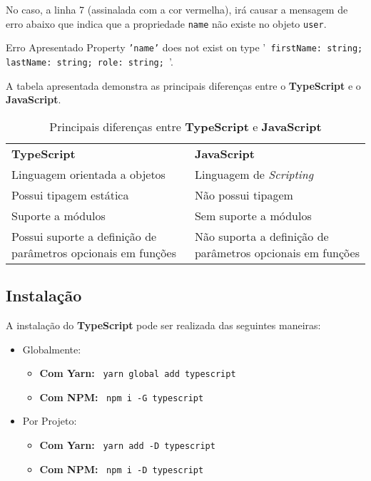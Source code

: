 No caso, a linha 7 (assinalada com a cor vermelha), irá causar a mensagem de erro abaixo que indica que a propriedade \texttt{name} não existe no objeto \texttt{user}.

\begin{errorbox}{Erro Apresentado}
	Property \texttt{'name'} does not exist on type '\texttt{{ firstName: string; lastName: string; role: string; }}'.
\end{errorbox}

A tabela apresentada demonstra as principais diferenças entre o \textbf{TypeScript} e o \textbf{JavaScript}.

\begin{table}[h!]
	\renewcommand{\arraystretch}{1.25}
	\begin{tabularx}{\textwidth}{ |X|X| }
		\rowcolor{estg}	{\color[HTML]{FFFFFF} \textbf{TypeScript}} & {\color[HTML]{FFFFFF} \textbf{JavaScript}} \\
		Linguagem orientada a objetos & Linguagem de \textit{Scripting} \\\hline
		Possui tipagem estática & Não possui tipagem \\\hline
		Suporte a módulos & Sem suporte a módulos\\\hline
		Possui suporte a definição de parâmetros opcionais em funções & Não suporta a definição de parâmetros opcionais em funções \\\hline
	\end{tabularx}

	\caption{Principais diferenças entre \textbf{TypeScript} e \textbf{JavaScript}}
\end{table}


\subsection{Instalação}

A instalação do \textbf{TypeScript} pode ser realizada das seguintes maneiras:

\begin{itemize}
	\item Globalmente:
	\begin{itemize}
		\item \textbf{Com Yarn:} ~\texttt{yarn global add typescript}
		\item \textbf{Com NPM:} ~\texttt{npm i -G typescript}
	\end{itemize}
	\item Por Projeto:
	\begin{itemize}
		\item \textbf{Com Yarn:} ~\texttt{yarn add -D typescript}
		\item \textbf{Com NPM:} ~\texttt{npm i -D typescript}
	\end{itemize}
\end{itemize}

